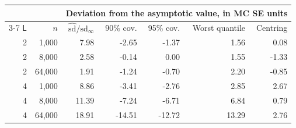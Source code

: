 \begin{tabular}{rrrrrrr}
\toprule
 & & \multicolumn{5}{c}{Deviation from the asymptotic value, in MC SE units} \\
\cmidrule(lr){3-7}
$\mathsf L$ & $n$ & $\hat{\mathrm{sd}}/\mathrm{sd}_\infty$ & 90\% cov. & 95\% cov. & Worst quantile & Centring \\
\midrule
2 & 1,000 & 7.98 & -2.65 & -1.37 & 1.56 & 0.08 \\
2 & 8,000 & 2.58 & -0.14 & 0.00 & 1.55 & -1.33 \\
2 & 64,000 & 1.91 & -1.24 & -0.70 & 2.20 & -0.85 \\
4 & 1,000 & 8.86 & -3.41 & -2.76 & 2.85 & 2.67 \\
4 & 8,000 & 11.39 & -7.24 & -6.71 & 6.84 & 0.79 \\
4 & 64,000 & 18.91 & -14.51 & -12.72 & 13.29 & 2.76 \\
\bottomrule
\end{tabular}
